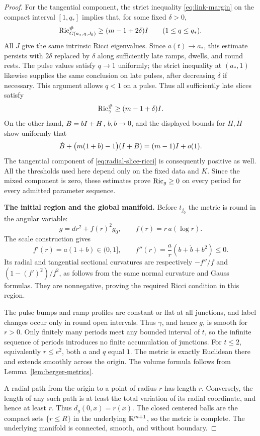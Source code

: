 \begin{proof}
For the tangential component, the strict inequality
\eqref{eq:link-margin} on the compact interval \([1,q_*]\) implies
that, for some fixed \(\delta>0\),
\[
 \operatorname{Ric}_{G(a_*,q,J_0)}^\#\geq(m-1+2\delta)I
       \qquad(1\leq q\leq q_*).
\]
All \(J\) give the same intrinsic Ricci eigenvalues.
Since \(a(t)\to a_*\), this estimate persists with \(2\delta\)
replaced by \(\delta\) along sufficiently late ramps, dwells, and
round rests.
The pulse values satisfy \(q\to1\) uniformly; the strict inequality
at \((a_*,1)\) likewise supplies the same conclusion on late pulses,
after decreasing \(\delta\) if necessary.
This argument allows \(q<1\) on a pulse.
Thus all sufficiently late slices satisfy
\[
 \operatorname{Ric}_\gamma^\#\geq(m-1+\delta)I.
\]
On the other hand, \(B=bI+H\), \(b,\dot b\to0\), and the displayed
bounds for \(H,\dot H\) show uniformly that
\[
 \dot B+\bigl(m(1+b)-1\bigr)(I+B)
       =(m-1)I+o(1).
\]
The tangential component of
\eqref{eq:radial-slice-ricci} is consequently positive as well.
All the thresholds used here depend only on the fixed data and
\(K\).  Since the mixed component is zero, these estimates prove
\(\operatorname{Ric}_g\geq0\) on every period for every admitted parameter sequence.

\medskip\noindent
\textbf{The initial region and the global manifold.}
Before \(t_{j_0}\) the metric is round in the angular variable:
\[
 g=dr^2+f(r)^2g_0,\qquad f(r)=r\,a(\log r).
\]
The scale construction gives
\[
 f'(r)=a(1+b)\in(0,1],\qquad
 f''(r)=\frac{a}{r}(b+\dot b+b^2)\leq0.
\]
Its radial and tangential sectional curvatures are respectively
\(-f''/f\) and \((1-(f')^2)/f^2\), as follows from the same normal
curvature and Gauss formulas.  They are nonnegative, proving the
required Ricci condition in this region.

The pulse bumps and ramp profiles are constant or flat at all
junctions, and label changes occur only in round open intervals.
Thus \(\gamma\), and hence \(g\), is smooth for \(r>0\).
Only finitely many periods meet any bounded interval of \(t\), so
the infinite sequence of periods introduces no finite accumulation
of junctions.
For \(t\leq2\), equivalently \(r\leq e^2\), both \(a\) and \(q\)
equal \(1\).  The metric is exactly Euclidean there and extends
smoothly across the origin.
The volume formula follows from Lemma~\ref{lem:berger-metrics}.

A radial path from the origin to a point of radius \(r\) has length
\(r\).  Conversely, the length of any such path is at least the
total variation of its radial coordinate, and hence at least \(r\).
Thus \(d_g(0,x)=r(x)\).
The closed centered balls are the compact sets \(\{r\leq R\}\)
in the underlying \(\mathbb R^{m+1}\), so the metric is complete.
The underlying manifold is connected, smooth, and without boundary.
\end{proof}
